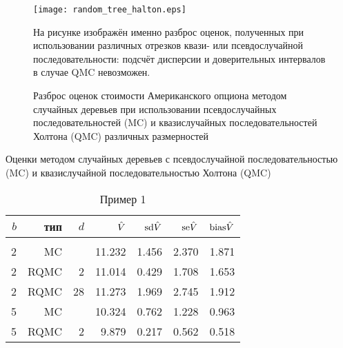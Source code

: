 \begin{figure}[p]
    \begin{center}
    \texttt{[image: random\_tree\_halton.eps]}\end{center}
    \caption{Разброс оценок стоимости Американского опциона методом случайных деревьев при использовании псевдослучайных последовательностей (MC) и квазислучайных последовательностей Холтона (QMC) различных размерностей}
    \label{fig:random_tree_halton}
    \linespread{0.8}\footnotesize{На рисунке изображён именно разброс оценок, полученных при использовании различных отрезков квази- или псевдослучайной последовательности: подсчёт дисперсии и доверительных интервалов в случае QMC невозможен.}
\end{figure}

\begin{table}
    \renewcommand{\arraystretch}{0.6}
    \centering
    Оценки методом случайных деревьев с псевдослучайной последовательностью (MC) и квазислучайной последовательностью Холтона (QMC)
    \caption{Пример 1}\label{tbl:random_tree_halton_ex1}
    \begin{tabular}{rrrrrrr}
        $b$&тип&$d$&$\hat{V}$&$\mathrm{sd}\hat{V}$&$\mathrm{se}\hat{V}$&$\mathrm{bias}\hat{V}$\\[3pt]\hline\\[-8pt]
        2&MC&&11.232&1.456&2.370&1.871\\
        2&RQMC&2&11.014&0.429&1.708&1.653\\
        2&RQMC&28&11.273&1.969&2.745&1.912\\[3pt]
        5&MC&&10.324&0.762&1.228&0.963\\
        5&RQMC&2&9.879&0.217&0.562&0.518\\[3pt]
    \end{tabular}


\end{table}
